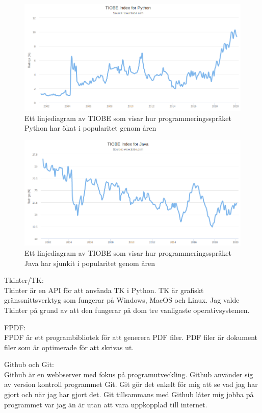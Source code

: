 \documentclass[a4paper, 12pt]{article}
\begin{document}
\begin{figure}[t!]
  \includegraphics[width=\linewidth]{img/TIOBE_python.png}
  \caption{Ett linjediagram av TIOBE som visar hur programmeringsspråket Python har ökat i popularitet genom åren}
  \label{fig:index_python}
\end{figure}
\begin{figure}[t!]
  \includegraphics[width=\linewidth]{img/TIOBE_java.png}
  \caption{Ett linjediagram av TIOBE som visar hur programmeringsspråket Java har sjunkit i popularitet genom åren}
  \label{fig:index_java}
\end{figure}


Tkinter/TK:\\
Tkinter är en API för att använda TK i Python. 
TK är grafiskt gränssnittsverktyg som fungerar på Windows, MacOS och Linux. 
Jag valde Tkinter på grund av att den fungerar på dom tre vanligaste operativsystemen.


FPDF:\\
FPDF är ett programbibliotek för att generera PDF filer.
PDF filer är dokument filer som är optimerade för att skrivas ut.


Github och Git:\\
Github är en webbserver med fokus på programutveckling. 
Github använder sig av version kontroll programmet Git. 
Git gör det enkelt för mig att se vad jag har gjort och när jag har gjort det.
Git tillsammans med Github låter mig jobba på programmet var jag än är utan att vara uppkopplad till internet.
\end{document}
